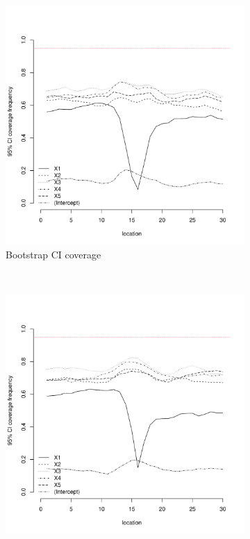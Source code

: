 \documentclass[authoryear, review, 11pt]{elsarticle}
\begin{document}
\begin{figure}
	\vspace{-30mm}
	\centering
	\begin{subfigure}[b]{0.45\textwidth}
	\centering
		\includegraphics[width=\textwidth]{../../figures/simulation/15.5.profile_bootstrap_coverage.pdf}
		\caption{Bootstrap CI coverage}
	\end{subfigure}%
	~ %
	\begin{subfigure}[b]{0.45\textwidth}
	\centering
		\includegraphics[width=\textwidth]{../../figures/simulation/15.5.profile_se_coverage.pdf}

\end{subfigure}
\end{figure}
\end{document}

